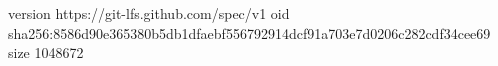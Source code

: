 version https://git-lfs.github.com/spec/v1
oid sha256:8586d90e365380b5db1dfaebf556792914dcf91a703e7d0206c282cdf34cee69
size 1048672
